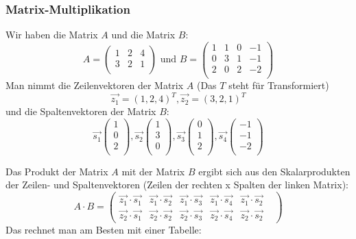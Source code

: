 \subsubsection{Matrix-Multiplikation}
Wir haben die Matrix $A$ und die Matrix $B$:
\[ A = 
  \begin {pmatrix}
    1 & 2 & 4 \\
    3 & 2 & 1 \\
  \end {pmatrix} \text{ und }
  B =
  \begin {pmatrix}
    1 & 1 & 0 & -1 \\
    0 & 3 & 1 & -1 \\
    2 & 0 & 2 & -2 \\
  \end {pmatrix}
\]
Man nimmt die Zeilenvektoren der Matrix $A$ (Das $T$ steht für
Transformiert)
\[ \vec{z_1} = (1, 2, 4)^T ,\vec{z_2} = (3, 2, 1)^T \]
und die Spaltenvektoren der Matrix $B$:
\[ \vec{s_1} \begin {pmatrix} 1 \\ 0 \\ 2 \\ \end {pmatrix}, 
 \vec{s_2} \begin {pmatrix} 1 \\ 3 \\ 0 \\ \end {pmatrix}, 
 \vec{s_3} \begin {pmatrix} 0 \\ 1 \\ 2 \\ \end {pmatrix}, 
 \vec{s_4} \begin {pmatrix} -1 \\ -1 \\ -2 \\ \end {pmatrix}
\]

Das Produkt der Matrix $A$ mit der Matrix $B$ ergibt sich aus den Skalarprodukten
der Zeilen- und Spaltenvektoren (Zeilen der rechten x Spalten der linken Matrix):
\[ A \cdot B =
  \begin {pmatrix}
    \vec{z_1} \cdot \vec{s_1} & \vec{z_1} \cdot \vec{s_2} & \vec{z_1} \cdot \vec{s_3} & \vec{z_1} \cdot \vec{s_4} & \vec{z_1} \cdot \vec{s_2} \\
    \vec{z_2} \cdot \vec{s_1} & \vec{z_2} \cdot \vec{s_2} & \vec{z_2} \cdot \vec{s_3} & \vec{z_2} \cdot \vec{s_4} & \vec{z_2} \cdot \vec{s_2} &
  \end {pmatrix} \]
Das rechnet man am Besten mit einer Tabelle:

